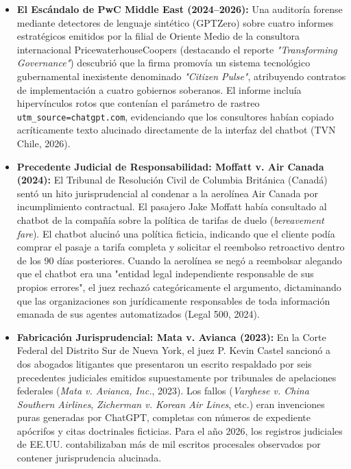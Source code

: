 \begin{itemize}
    \item \textbf{El Escándalo de PwC Middle East (2024--2026):} Una auditoría forense mediante detectores de lenguaje sintético (GPTZero) sobre cuatro informes estratégicos emitidos por la filial de Oriente Medio de la consultora internacional PricewaterhouseCoopers (destacando el reporte \textit{"Transforming Governance"}) descubrió que la firma promovía un sistema tecnológico gubernamental inexistente denominado \textit{"Citizen Pulse"}, atribuyendo contratos de implementación a cuatro gobiernos soberanos. El informe incluía hipervínculos rotos que contenían el parámetro de rastreo \texttt{utm\_source=chatgpt.com}, evidenciando que los consultores habían copiado acríticamente texto alucinado directamente de la interfaz del chatbot (TVN Chile, 2026).
    \item \textbf{Precedente Judicial de Responsabilidad: Moffatt v. Air Canada (2024):} El Tribunal de Resolución Civil de Columbia Británica (Canadá) sentó un hito jurisprudencial al condenar a la aerolínea Air Canada por incumplimiento contractual. El pasajero Jake Moffatt había consultado al chatbot de la compañía sobre la política de tarifas de duelo (\textit{bereavement fare}). El chatbot alucinó una política ficticia, indicando que el cliente podía comprar el pasaje a tarifa completa y solicitar el reembolso retroactivo dentro de los 90 días posteriores. Cuando la aerolínea se negó a reembolsar alegando que el chatbot era una "entidad legal independiente responsable de sus propios errores", el juez rechazó categóricamente el argumento, dictaminando que las organizaciones son jurídicamente responsables de toda información emanada de sus agentes automatizados (Legal 500, 2024).
    \item \textbf{Fabricación Jurisprudencial: Mata v. Avianca (2023):} En la Corte Federal del Distrito Sur de Nueva York, el juez P. Kevin Castel sancionó a dos abogados litigantes que presentaron un escrito respaldado por seis precedentes judiciales emitidos supuestamente por tribunales de apelaciones federales (\textit{Mata v. Avianca, Inc.}, 2023). Los fallos (\textit{Varghese v. China Southern Airlines}, \textit{Zicherman v. Korean Air Lines}, etc.) eran invenciones puras generadas por ChatGPT, completas con números de expediente apócrifos y citas doctrinales ficticias. Para el año 2026, los registros judiciales de EE.UU. contabilizaban más de mil escritos procesales observados por contener jurisprudencia alucinada.
\end{itemize}

